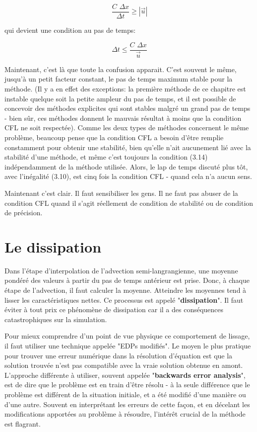 \documentclass[11pt]{report}
\begin{document}
\begin{equation}
\frac{C\,\,\Delta x}{\Delta t} \geq |\overrightarrow{u}|
\end{equation}

qui devient une condition au pas de temps:

\begin{equation}
\Delta t \leq \frac{C\,\,\Delta x}{\overrightarrow{u}}
\end{equation}

Maintenant, c'est là que toute la confusion apparait. C'est souvent le même, jusqu'à un petit facteur constant, le pas de temps maximum stable pour la méthode. (Il y a en effet des exceptions: la première méthode de ce chapitre est instable quelque soit la petite ampleur du pas de temps, et il est possible de concevoir des méthodes explicites qui sont stables malgré un grand pas de temps - bien sûr, ces méthodes donnent le mauvais résultat à moins que la condition CFL ne soit respectée). Comme les deux types de méthodes concernent le même problème, beaucoup pense que la condition CFL a besoin d'être remplie constamment pour obtenir une stabilité, bien qu'elle n'ait aucunement lié avec la stabilité d'une méthode, et même c'est toujours la condition (3.14) indépendamment de la méthode utilisée. Alors, le lap de temps discuté plus tôt, avec l'inégalité (3.10), est cinq fois la condition CFL - quand cela n'a aucun sens.\newline

Maintenant c'est clair. Il faut sensibiliser les gens. Il ne faut pas abuser de la condition CFL quand il s'agit réellement de condition de stabilité ou de condition de précision. 

\section{Le dissipation}

Dans l'étape d'interpolation de l'advection semi-langrangienne, une moyenne pondéré des valeurs à partir du pas de temps antérieur est prise. Donc, à chaque étape de l'advection, il faut calculer la moyenne. Atteindre les moyennes tend à lisser les caractéristiques nettes. Ce processus est appelé "\textbf{dissipation}". Il faut éviter à tout prix ce phénomène de dissipation car il a des conséquences catastrophiques sur la simulation.

Pour mieux comprendre d'un point de vue physique ce comportement de lissage, il faut utiliser une technique appelée "EDPs modifiés". Le moyen le plus pratique pour trouver une erreur numérique dans la résolution d'équation est que la solution trouvée n'est pas compatible avec la vraie solution obtenue en amont. L'approche différente à utiliser, souvent appelée "\textbf{backwards error analysis}", est de dire que le problème est en train d'être résolu - à la seule différence que le problème est différent de la situation initiale, et a été modifié d'une manière ou d'une autre. Souvent en interprétant les erreurs de cette façon, et en décelant les modifications apportées au problème à résoudre, l'intérêt crucial de la méthode est flagrant.
\end{document}
